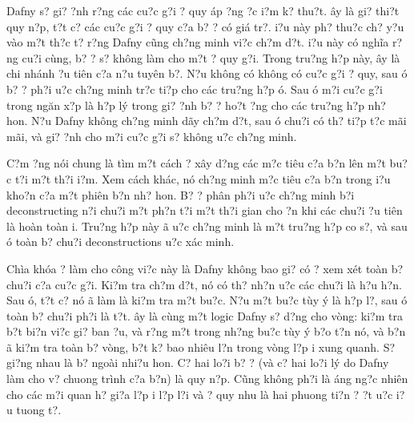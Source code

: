 \documentclass{article} %
\begin{document}
Dafny s? gi? {\dj}?nh r?ng c\'{a}c cu?c g?i {\dj}? quy {\dj}\'{a}p ?ng {\dj}?c {\dj}i?m k? thu?t. {\DJ}\^{a}y l\`{a} gi? thi?t quy n?p, t?t c? c\'{a}c cu?c g?i {\dj}? quy c?a b? {\dj}? c\'{o} gi\'{a} tr?. {\DJ}i?u n\`{a}y ph? thu?c ch? y?u v\`{a}o m?t th?c t? r?ng Dafny c\~{u}ng ch?ng minh vi?c ch?m d?t. {\DJ}i?u n\`{a}y c\'{o} ngh\~{i}a r?ng cu?i c\`{u}ng, b? {\dj}? s? kh\^{o}ng l\`{a}m cho m?t {\dj}? quy g?i. Trong tru?ng h?p n\`{a}y, {\dj}\^{a}y l\`{a} chi nh\'{a}nh {\dj}?u ti\^{e}n c?a n?u tuy\^{e}n b?. N?u kh\^{o}ng c\'{o} kh\^{o}ng c\'{o} cu?c g?i {\dj}? quy, sau {\dj}\'{o} b? {\dj}? ph?i {\dj}u?c ch?ng minh tr?c ti?p cho c\'{a}c tru?ng h?p {\dj}\'{o}. Sau {\dj}\'{o} m?i cu?c g?i trong ng\u{a}n x?p l\`{a} h?p l\'{y} trong gi? {\dj}?nh b? {\dj}? ho?t {\dj}?ng cho c\'{a}c tru?ng h?p nh? hon. N?u Dafny kh\^{o}ng ch?ng minh d\~{a}y ch?m d?t, sau {\dj}\'{o} chu?i c\'{o} th? ti?p t?c m\~{a}i m\~{a}i, v\`{a} gi? {\dj}?nh cho m?i cu?c g?i s? kh\^{o}ng {\dj}u?c ch?ng minh.

C?m ?ng n\'{o}i chung l\`{a} t\`{i}m m?t c\'{a}ch {\dj}? x\^{a}y d?ng c\'{a}c m?c ti\^{e}u c?a b?n l\^{e}n m?t bu?c t?i m?t th?i {\dj}i?m. Xem c\'{a}ch kh\'{a}c, n\'{o} ch?ng minh m?c ti\^{e}u c?a b?n trong {\dj}i?u kho?n c?a m?t phi\^{e}n b?n nh? hon. B? {\dj}? ph\^{a}n ph?i {\dj}u?c ch?ng minh b?i deconstructing n?i chu?i m?t ph?n t?i m?t th?i gian cho {\dj}?n khi c\'{a}c chu?i {\dj}?u ti\^{e}n l\`{a} ho\`{a}n to\`{a}n {\dj}i. Tru?ng h?p n\`{a}y {\dj}\~{a} {\dj}u?c ch?ng minh l\`{a} m?t tru?ng h?p co s?, v\`{a} sau {\dj}\'{o} to\`{a}n b? chu?i deconstructions {\dj}u?c x\'{a}c minh.

Ch\`{i}a kh\'{o}a {\dj}? l\`{a}m cho c\^{o}ng vi?c n\`{a}y l\`{a} Dafny kh\^{o}ng bao gi? c\'{o} {\dj}? xem x\'{e}t to\`{a}n b? chu?i c?a cu?c g?i. Ki?m tra ch?m d?t, n\'{o} c\'{o} th? nh?n {\dj}u?c c\'{a}c chu?i l\`{a} h?u h?n. Sau {\dj}\'{o}, t?t c? n\'{o} {\dj}\~{a} l\`{a}m l\`{a} ki?m tra m?t bu?c. N?u m?t bu?c t\`{u}y \'{y} l\`{a} h?p l?, sau {\dj}\'{o} to\`{a}n b? chu?i ph?i l\`{a} t?t. {\DJ}\^{a}y l\`{a} c\`{u}ng m?t logic Dafny s? d?ng cho v\`{o}ng: ki?m tra b?t bi?n vi?c gi? ban {\dj}?u, v\`{a} r?ng m?t trong nh?ng bu?c t\`{u}y \'{y} b?o t?n n\'{o}, v\`{a} b?n {\dj}\~{a} ki?m tra to\`{a}n b? v\`{o}ng, b?t k? bao nhi\^{e}u l?n trong v\`{o}ng l?p {\dj}i xung quanh. S? gi?ng nhau l\`{a} b? ngo\`{a}i nhi?u hon. C? hai lo?i b? {\dj}? (v\`{a} c? hai lo?i l\'{y} do Dafny l\`{a}m cho v? chuong tr\`{i}nh c?a b?n) l\`{a} quy n?p. C\~{u}ng kh\^{o}ng ph?i l\`{a} {\dj}\'{a}ng ng?c nhi\^{e}n cho c\'{a}c m?i quan h? gi?a l?p {\dj}i l?p l?i v\`{a} {\dj}? quy nhu l\`{a} hai phuong ti?n {\dj}? {\dj}?t {\dj}u?c {\dj}i?u tuong t?.
\end{document}
